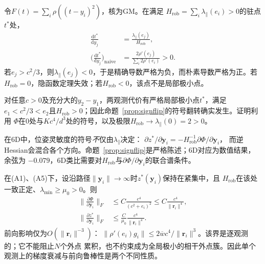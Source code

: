 \begin{proposition}[一维符号翻转]\label{prop:signflip}
令$F(t)=\sum_i\rho((t-y_i)^2)$，核为GM。在满足
$H_{\mathrm{rob}}=\sum_i\lambda_\parallel(e_i)>0$的驻点$t^*$处，
\begin{equation}
\begin{aligned}
\frac{\mathrm{d}t^*}{\mathrm{d}y_j}&=\frac{\lambda_\parallel(e_j)}{H_{\mathrm{rob}}},\\
\Big(\frac{\mathrm{d}t^*}{\mathrm{d}y_j}\Big)_{\mathrm{naive}}
&=\frac{2\rho'(e_j)}{\sum_i2\rho'(e_i)}>0.
\end{aligned}
\end{equation}
若$e_j>c^2/3$，则$\lambda_\parallel(e_j)<0$，于是精确导数严格为负，而朴素导数严格为正。若
$H_{\mathrm{rob}}=0$，隐函数定理失效；若$H_{\mathrm{rob}}<0$，该点不是局部极小点。
\end{proposition}

\begin{proposition}[存在性]\label{prop:existence}
对任意$c>0$及充分大的$y_2-y_1$，两观测代价有严格局部极小点$t^*$，满足
$e_1<c^2/3<e_2$且$H_{\mathrm{rob}}>0$；因此命题~\ref{prop:signflip}的符号翻转确实发生。证明利用
$\Phi$在$0$处与$Kc^4/d^3$处的符号，以及极限$H_{\mathrm{rob}}\to\lambda_\parallel(0)=2>0$。
\end{proposition}

在6D中，位姿灵敏度的符号\emph{不}仅由$\lambda_\parallel$决定：
$\partial z^*/\partial\mathbf{y}_i=-H_{\mathrm{rob}}^{-1}\partial\Phi/\partial\mathbf{y}_i$，
而逆Hessian会混合各个方向。命题~\ref{prop:signflip}是严格陈述；6D对应为数值结果，余弦为
$-0.079$，6D类比需要对$H_{\mathrm{rob}}$与$\partial\Phi/\partial\mathbf{y}_i$的联合谱条件。

\begin{proposition}\label{prop:bound}
在(A1)、(A5)下，设沿路径$\|\mathbf{y}_i\|\to\infty$时$z^*(\mathbf{y}_i)$保持在紧集中，且
$H_{\mathrm{rob}}$在该处一致正定、$\lambda_{\min}\ge\mu_0>0$。则
\begin{equation}
\begin{aligned}
\Big\|\frac{\partial\Phi}{\partial\mathbf{y}_i}\Big\|_F&\le C\frac{c^4}{(c^2+e_i)^2}
\le C\frac{c^4}{\|\mathbf{r}_i\|^4},\\
\Big\|\frac{\partial z^*}{\partial\mathbf{y}_i}\Big\|_F&\le\frac{C}{\mu_0}
\frac{c^4}{\|\mathbf{r}_i\|^4}.
\end{aligned}
\end{equation}
前向影响仅为$O(\|\mathbf{r}_i\|^{-3})$：
$\|\rho'(e_i)g_i\|\le2\overline wc^4/\|\mathbf{r}_i\|^3$。该界是逐观测的；它不能阻止$N$个外点
累积，也不约束成为全局极小的相干外点簇。因此单个观测上的梯度衰减与前向鲁棒性是两个不同性质。
\end{proposition}

